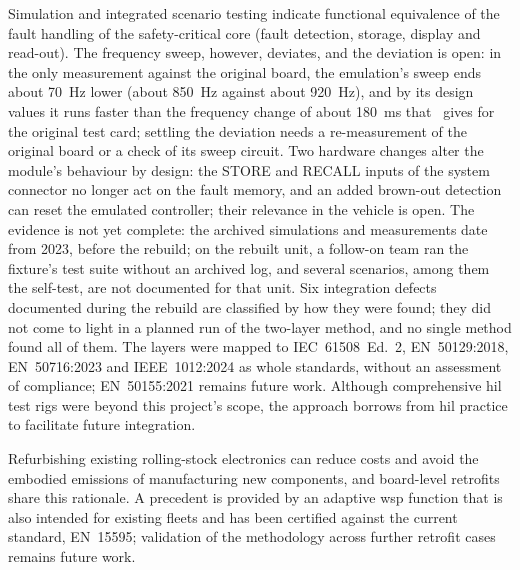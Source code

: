 Simulation and integrated scenario testing indicate functional equivalence of the fault handling of the safety-critical core (fault detection, storage, display and read-out). The frequency sweep, however, deviates, and the deviation is open: in the only measurement against the original board, the emulation's sweep ends about 70~Hz lower (about 850~Hz against about 920~Hz), and by its design values it runs faster than the frequency change of about 180~ms that~\cite{dolata2023} gives for the original test card; settling the deviation needs a re-measurement of the original board or a check of its sweep circuit. Two hardware changes alter the module's behaviour by design: the STORE and RECALL inputs of the system connector no longer act on the fault memory, and an added brown-out detection can reset the emulated controller; their relevance in the vehicle is open. The evidence is not yet complete: the archived simulations and measurements date from 2023, before the rebuild; on the rebuilt unit, a follow-on team ran the fixture's test suite without an archived log, and several scenarios, among them the self-test, are not documented for that unit. Six integration defects documented during the rebuild are classified by how they were found; they did not come to light in a planned run of the two-layer method, and no single method found all of them. The layers were mapped to IEC~61508~Ed.~2, EN~50129:2018, EN~50716:2023 and IEEE~1012:2024 as whole standards, without an assessment of compliance; EN~50155:2021 remains future work. Although comprehensive \gls{hil} test rigs were beyond this project's scope, the approach borrows from \gls{hil} practice to facilitate future integration.

Refurbishing existing rolling-stock electronics can reduce costs and avoid the embodied emissions of manufacturing new components, and board-level retrofits share this rationale. A precedent is provided by an adaptive \gls{wsp} function that is also intended for existing fleets and has been certified against the current standard, EN~15595; validation of the methodology across further retrofit cases remains future work.
